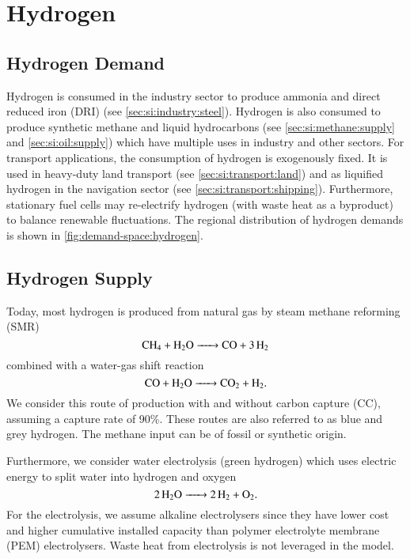 \section{Hydrogen}
\label{sec:si:h2}

\subsection{Hydrogen Demand}
\label{sec:si:h2:demand}

Hydrogen is consumed in the industry sector to produce ammonia and direct
reduced iron (DRI) (see \cref{sec:si:industry:steel}). Hydrogen is also consumed
to produce synthetic methane and liquid hydrocarbons (see
\cref{sec:si:methane:supply} and \cref{sec:si:oil:supply}) which have multiple
uses in industry and other sectors. For transport applications, the consumption
of hydrogen is exogenously fixed. It is used in heavy-duty land transport (see
\cref{sec:si:transport:land}) and as liquified hydrogen in the navigation sector
(see \cref{sec:si:transport:shipping}). Furthermore, stationary fuel cells may
re-electrify hydrogen (with waste heat as a byproduct) to balance renewable
fluctuations. The regional distribution of hydrogen demands is shown in
\cref{fig:demand-space:hydrogen}.

\subsection{Hydrogen Supply}
\label{sec:si:h2:supply}

Today, most hydrogen is produced from natural gas by steam methane reforming
(SMR)
\begin{equation}
    \ce{ CH4 + H2O -> CO + 3H2 }
\end{equation}
combined with a water-gas shift reaction
\begin{equation}
    \ce{CO + H2O -> CO2 + H2}.
\end{equation}
We consider this route of production with and without carbon capture (CC),
assuming a capture rate of 90\%. These routes are also referred to as blue and
grey hydrogen. The methane input can be of fossil or synthetic origin.

Furthermore, we consider water electrolysis (green hydrogen) which uses electric
energy to split water into hydrogen and oxygen
\begin{equation}
    \ce{2H2O -> 2 H2 + O2}.
\end{equation}
For the electrolysis, we assume alkaline electrolysers since they have lower
cost and higher cumulative installed capacity than polymer
electrolyte membrane (PEM) electrolysers. Waste heat from electrolysis is not
leveraged in the model.

